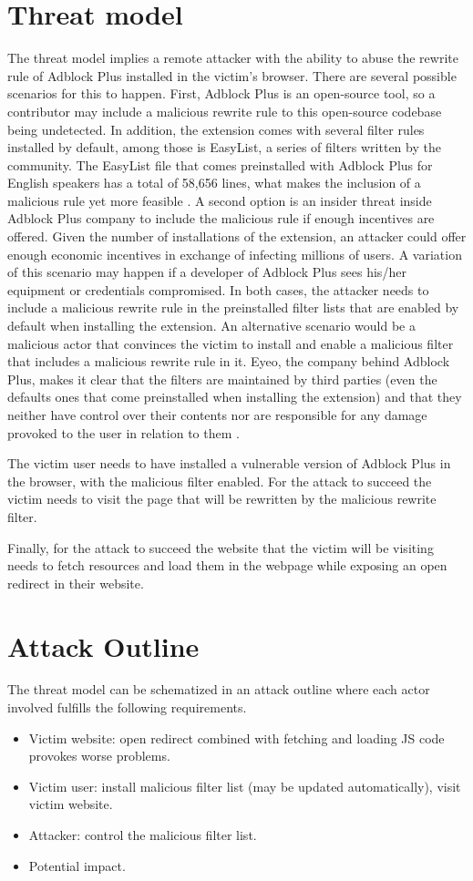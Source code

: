 \documentclass[conference]{IEEEtran}
\begin{document}
\section{Threat model}
The threat model implies a remote attacker with the ability to abuse the rewrite rule of Adblock Plus installed in the victim's browser. There are several possible scenarios for this to happen. First, Adblock Plus is an open-source tool, so a contributor may include a malicious rewrite rule to this open-source codebase being undetected. In addition, the extension comes with several filter rules installed by default, among those is EasyList, a series of filters written by the community. The EasyList file that comes preinstalled with Adblock Plus for English speakers has a total of 58,656 lines, what makes the inclusion of a malicious rule yet more feasible \cite{EasyList}. A second option is an insider threat inside Adblock Plus company to include the malicious rule if enough incentives are offered. Given the number of installations of the extension, an attacker could offer enough economic incentives in exchange of infecting millions of users. A variation of this scenario may happen if a developer of Adblock Plus sees his/her equipment or credentials compromised. In both cases, the attacker needs to include a malicious rewrite rule in the preinstalled filter lists that are enabled by default when installing the extension. 
An alternative scenario would be a malicious actor that convinces the victim to install and enable a malicious filter that includes a malicious rewrite rule in it. Eyeo, the company behind Adblock Plus, makes it clear that the filters are maintained by third parties (even the defaults ones that come preinstalled when installing the extension) and that they neither have control over their contents nor are responsible for any damage provoked to the user in relation to them \cite{abp_suscriptions}.

The victim user needs to have installed a vulnerable version of Adblock Plus in the browser, with the malicious filter enabled. For the attack to succeed the victim needs to visit the page that will be rewritten by the malicious rewrite filter.	

Finally, for the attack to succeed the website that the victim will be visiting needs to fetch resources and load them in the webpage while exposing an open redirect in their website.

\section{Attack Outline}
The threat model can be schematized in an attack outline where each actor involved fulfills the following requirements.
\begin{itemize}
\item Victim website: open redirect combined with fetching and loading JS code provokes worse problems.
\item Victim user: install malicious filter list (may be updated automatically), visit victim website.
\item Attacker: control the malicious filter list.
\item Potential impact.
\end{itemize}
\end{document}
